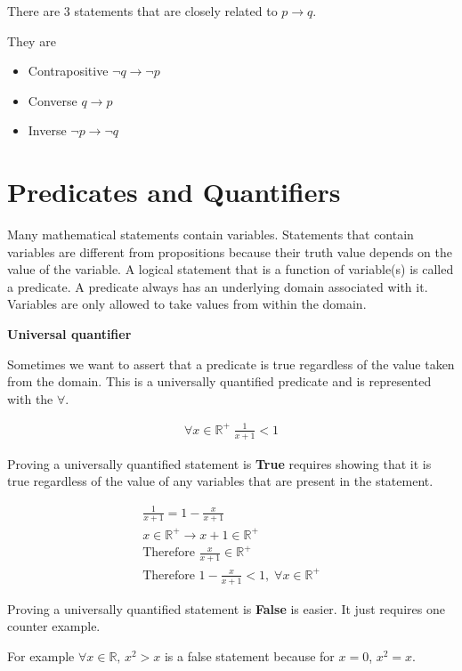 \documentclass[12pt]{article}
\begin{document}
There are 3 statements that are closely related to $p \rightarrow q$.

They are 

\begin{itemize}
\item Contrapositive $\neg q \rightarrow \neg p$
\item Converse $q \rightarrow p$
\item Inverse $\neg p \rightarrow \neg q$
\end{itemize}

\section*{Predicates and Quantifiers}
Many mathematical statements contain variables. Statements that contain variables are different from propositions because their truth value depends on the value of the variable. A logical statement that is a function of variable(s) is called a predicate. A predicate always has an underlying domain associated with it. Variables are only allowed to take values from within the domain.

\medskip

\textbf{Universal quantifier}

Sometimes we want to assert that a predicate is true regardless of the value taken from the domain. This is a universally quantified predicate and is represented with the $\forall$.

\begin{align*}
\forall x \in \mathbb{R^+} \; \frac{1}{x+1} < 1
\end{align*}

Proving a universally quantified statement is \textbf{True} requires showing that it is true regardless of the value of any variables that are present in the statement.

\begin{align*}
\frac{1}{x+1} = 1 - \frac{x}{x+1} \\
x \in \mathbb{R^+} \rightarrow x + 1 \in \mathbb{R^+} \\
\text{Therefore } \frac{x}{x+1} \in \mathbb{R^+}\\
\text{Therefore } 1 - \frac{x}{x+1} < 1, \; \forall x \in \mathbb{R^+} 
\end{align*}

Proving a universally quantified statement is \textbf{False} is easier. It just requires one counter example.

For example $\forall x \in \mathbb{R}, \, x^2 > x$ is a false statement because for $x = 0$, $x^2 = x$.
\end{document}
